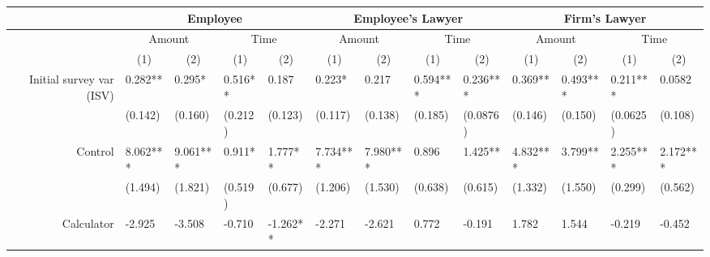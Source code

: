 \begin{tabular}{rrrrrrrrrrrrr}
\toprule
      & \multicolumn{4}{c}{Employee}  & \multicolumn{4}{c}{Employee's Lawyer} & \multicolumn{4}{c}{Firm's Lawyer} \\
\midrule
      & \multicolumn{2}{c}{Amount} & \multicolumn{2}{c}{Time} & \multicolumn{2}{c}{Amount} & \multicolumn{2}{c}{Time} & \multicolumn{2}{c}{Amount} & \multicolumn{2}{c}{Time} \\
      & \multicolumn{1}{c}{(1)} & \multicolumn{1}{c}{(2)} & \multicolumn{1}{c}{(1)} & \multicolumn{1}{c}{(2)} & \multicolumn{1}{c}{(1)} & \multicolumn{1}{c}{(2)} & \multicolumn{1}{c}{(1)} & \multicolumn{1}{c}{(2)} & \multicolumn{1}{c}{(1)} & \multicolumn{1}{c}{(2)} & \multicolumn{1}{c}{(1)} & \multicolumn{1}{c}{(2)} \\
Initial survey var (ISV) & \multicolumn{1}{l}{0.282**} & \multicolumn{1}{l}{0.295*} & \multicolumn{1}{l}{0.516**} & \multicolumn{1}{l}{0.187} & \multicolumn{1}{l}{0.223*} & \multicolumn{1}{l}{0.217} & \multicolumn{1}{l}{0.594***} & \multicolumn{1}{l}{0.236***} & \multicolumn{1}{l}{0.369**} & \multicolumn{1}{l}{0.493***} & \multicolumn{1}{l}{0.211***} & \multicolumn{1}{l}{0.0582} \\
      & \multicolumn{1}{l}{(0.142)} & \multicolumn{1}{l}{(0.160)} & \multicolumn{1}{l}{(0.212)} & \multicolumn{1}{l}{(0.123)} & \multicolumn{1}{l}{(0.117)} & \multicolumn{1}{l}{(0.138)} & \multicolumn{1}{l}{(0.185)} & \multicolumn{1}{l}{(0.0876)} & \multicolumn{1}{l}{(0.146)} & \multicolumn{1}{l}{(0.150)} & \multicolumn{1}{l}{(0.0625)} & \multicolumn{1}{l}{(0.108)} \\
Control & \multicolumn{1}{l}{8.062***} & \multicolumn{1}{l}{9.061***} & \multicolumn{1}{l}{0.911*} & \multicolumn{1}{l}{1.777**} & \multicolumn{1}{l}{7.734***} & \multicolumn{1}{l}{7.980***} & \multicolumn{1}{l}{0.896} & \multicolumn{1}{l}{1.425**} & \multicolumn{1}{l}{4.832***} & \multicolumn{1}{l}{3.799**} & \multicolumn{1}{l}{2.255***} & \multicolumn{1}{l}{2.172***} \\
      & \multicolumn{1}{l}{(1.494)} & \multicolumn{1}{l}{(1.821)} & \multicolumn{1}{l}{(0.519)} & \multicolumn{1}{l}{(0.677)} & \multicolumn{1}{l}{(1.206)} & \multicolumn{1}{l}{(1.530)} & \multicolumn{1}{l}{(0.638)} & \multicolumn{1}{l}{(0.615)} & \multicolumn{1}{l}{(1.332)} & \multicolumn{1}{l}{(1.550)} & \multicolumn{1}{l}{(0.299)} & \multicolumn{1}{l}{(0.562)} \\
Calculator & \multicolumn{1}{l}{-2.925} & \multicolumn{1}{l}{-3.508} & \multicolumn{1}{l}{-0.710} & \multicolumn{1}{l}{-1.262**} & \multicolumn{1}{l}{-2.271} & \multicolumn{1}{l}{-2.621} & \multicolumn{1}{l}{0.772} & \multicolumn{1}{l}{-0.191} & \multicolumn{1}{l}{1.782} & \multicolumn{1}{l}{1.544} & \multicolumn{1}{l}{-0.219} & \multicolumn{1}{l}{-0.452} \\

\end{tabular}
